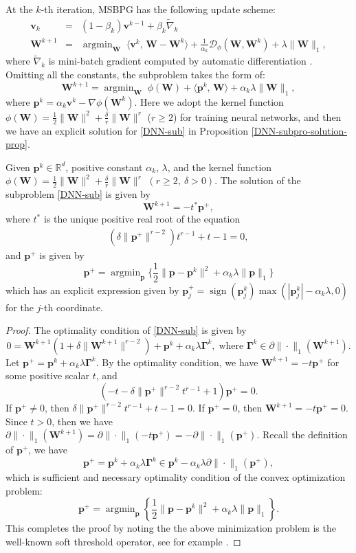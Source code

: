 \documentclass[twoside,11pt]{article}
\newcommand{\be}{\begin{equation}}
\newcommand{\ee}{\end{equation}}
\newcommand{\R}{\mathbb R}
\newcommand{\cD}{\mathcal D}
\DeclareMathOperator*{\argmin}{argmin}
\def\inprod#1#2{\langle#1,\,#2\rangle}
\def\vp{{\bm{p}}}
\def\vv{{\bm{v}}}
\def\mW{{\bm{W}}}
\begin{document}
At the $k$-th iteration, MSBPG has the following update scheme:
\begin{eqnarray}
	\vv_{k} &=& (1-\beta_k)\vv^{k-1}+\beta_k\widetilde\nabla_k
	\\[5pt]
    {\mW}^{k+1} &=& \argmin_{\mW}\;\inprod{\vv^k}{{\mW}-{\mW}^k}+\frac{1}{\alpha_k}\cD_\phi({\mW},{\mW}^k)+\lambda\|\mW\|_1,
    \label{DNN-sub-ori}
\end{eqnarray}
where $\widetilde\nabla_k$ is mini-batch gradient computed by automatic
differentiation \citep{griewank2008evaluating}. Omitting all the constants, the subproblem takes the form of:
\be 
{\mW}^{k+1}=\argmin_{\mW}\;\phi({\mW})+\inprod{\vp^k}{{\mW}}+\alpha_k\lambda\|{\mW}\|_1,
\label{DNN-sub}
\ee
where $\vp^k=\alpha_k\vv^k-\nabla\phi({\mW}^k)$. Here we adopt the kernel function $\phi({\mW})=\frac{1}{2}\|{\mW}\|^2+\frac{\delta}{r}\|{\mW}\|^{r}$ ($r \ge 2$) for training neural networks, and
then we have an explicit solution for \eqref{DNN-sub} in Proposition \ref{DNN-subpro-solution-prop}. %
\begin{proposition}
Given $\vp^k \in \R^d$, positive constant $\alpha_k$, $\lambda$, and the kernel function $\phi({\mW})=\frac{1}{2}\|{\mW}\|^2+\frac{\delta}{r}\|{\mW}\|^{r}$ $(r \geq 2,\ \delta>0)$. The solution of the subproblem \eqref{DNN-sub} is given by 
\[
{\mW}^{k+1}=-t^*\vp^+,
\]
where $t^*$ is the unique positive real root of the equation
\begin{eqnarray}
(\delta\|\vp^+\|^{r-2})t^{r-1}+t-1=0,
\label{eq-t*}
\end{eqnarray}
and $\vp^+$ is given by 
\[
\vp^+ = \argmin_\vp\Big\{\frac{1}{2}\|\vp-\vp^k\|^2+\alpha_k\lambda\|\vp\|_1\Big\}
\]
which has an explicit expression given by $\vp_j^+ = \operatorname{sign}(\vp_j^k) \max(|\vp_j^k|-\alpha_k\lambda,0)$ for 
the $j$-th coordinate.
\begin{proof}
The optimality condition of \eqref{DNN-sub} is given by 
\[
0=\mW^{k+1}(1+\delta\|\mW^{k+1}\|^{r-2})+\vp^k+\alpha_k\lambda{\bm\Gamma}^k,\;\text{where }{\bm\Gamma}^k\in\partial\|\cdot\|_1(\mW^{k+1}).
\]
Let $\vp^+=\vp^k+\alpha_k\lambda{\bm\Gamma}^k$. By the optimality condition, we have $\mW^{k+1}=-t\vp^+$ for some positive scalar $t$, and 
\[
(-t-\delta\|\vp^+\|^{r-2}t^{r-1}+1)\vp^+=0.
\]
If $\vp^+\neq0$, then $\delta\|\vp^+\|^{r-2}t^{r-1}+t-1=0$. If $\vp^+=0$, then $\mW^{k+1}=-t\vp^+=0$. Since $t>0$, then we have $\partial\|\cdot\|_1(\mW^{k+1})=\partial\|\cdot\|_1(-t\vp^+)=-\partial\|\cdot\|_1(\vp^+)$. Recall the definition of $\vp^+$, we have 
\[
\vp^+=\vp^k+\alpha_k\lambda{\bm\Gamma}^k\in\vp^k-\alpha_k\lambda\partial\|\cdot\|_1(\vp^+),
\]
which is sufficient and necessary 
optimality condition of the convex optimization problem:
\[
\vp^+ = \argmin_\vp\left\{\frac{1}{2}\|\vp-\vp^k\|^2+\alpha_k\lambda\|\vp\|_1\right\}.
\]
This completes the proof by noting the the above minimization problem is the well-known soft threshold operator, see for example \cite{friedman2010regularization}. 
\end{proof}

\label{DNN-subpro-solution-prop}
\end{proposition}
\end{document}
